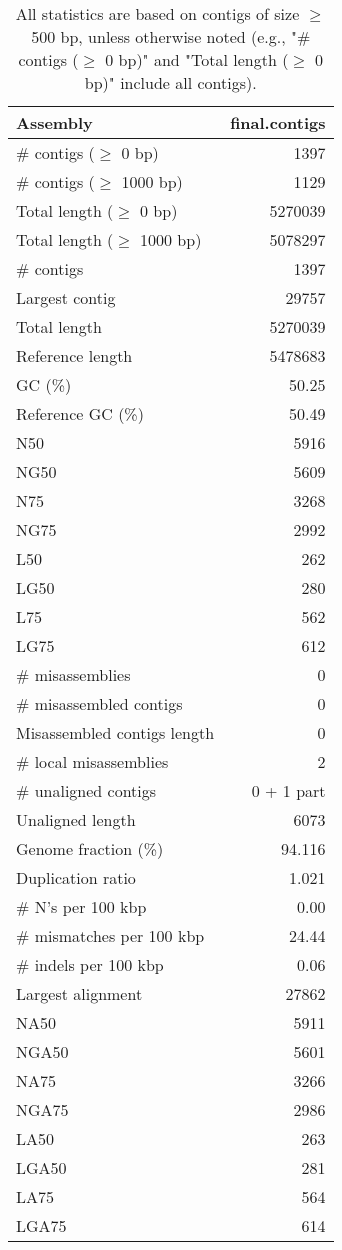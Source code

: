 \documentclass[12pt,a4paper]{article}
\begin{document}
\begin{table}[ht]
\begin{center}
\caption{All statistics are based on contigs of size $\geq$ 500 bp, unless otherwise noted (e.g., "\# contigs ($\geq$ 0 bp)" and "Total length ($\geq$ 0 bp)" include all contigs).}
\begin{tabular}{|l*{1}{|r}|}
\hline
Assembly & final.contigs \\ \hline
\# contigs ($\geq$ 0 bp) & 1397 \\ \hline
\# contigs ($\geq$ 1000 bp) & 1129 \\ \hline
Total length ($\geq$ 0 bp) & 5270039 \\ \hline
Total length ($\geq$ 1000 bp) & 5078297 \\ \hline
\# contigs & 1397 \\ \hline
Largest contig & 29757 \\ \hline
Total length & 5270039 \\ \hline
Reference length & 5478683 \\ \hline
GC (\%) & 50.25 \\ \hline
Reference GC (\%) & 50.49 \\ \hline
N50 & 5916 \\ \hline
NG50 & 5609 \\ \hline
N75 & 3268 \\ \hline
NG75 & 2992 \\ \hline
L50 & 262 \\ \hline
LG50 & 280 \\ \hline
L75 & 562 \\ \hline
LG75 & 612 \\ \hline
\# misassemblies & 0 \\ \hline
\# misassembled contigs & 0 \\ \hline
Misassembled contigs length & 0 \\ \hline
\# local misassemblies & 2 \\ \hline
\# unaligned contigs & 0 + 1 part \\ \hline
Unaligned length & 6073 \\ \hline
Genome fraction (\%) & 94.116 \\ \hline
Duplication ratio & 1.021 \\ \hline
\# N's per 100 kbp & 0.00 \\ \hline
\# mismatches per 100 kbp & 24.44 \\ \hline
\# indels per 100 kbp & 0.06 \\ \hline
Largest alignment & 27862 \\ \hline
NA50 & 5911 \\ \hline
NGA50 & 5601 \\ \hline
NA75 & 3266 \\ \hline
NGA75 & 2986 \\ \hline
LA50 & 263 \\ \hline
LGA50 & 281 \\ \hline
LA75 & 564 \\ \hline
LGA75 & 614 \\ \hline
\end{tabular}
\end{center}
\end{table}
\end{document}
